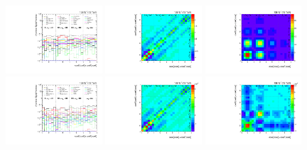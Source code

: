 \begin{figure}[htb]
\begin{center}
 \includegraphics[width=0.32\textwidth]{fig_fullRun2UL/unfolding/combined/deltaSystCombinedlog_rebinnedB_c_Pnk_mttbar.pdf}
 \includegraphics[width=0.32\textwidth]{fig_fullRun2UL/unfolding/combined/StatCovMatrix_rebinnedB_c_Pnk_mttbar.pdf}
 \includegraphics[width=0.32\textwidth]{fig_fullRun2UL/unfolding/combined/TotalSystCovMatrix_rebinnedB_c_Pnk_mttbar.pdf} \\
 \includegraphics[width=0.32\textwidth]{fig_fullRun2UL/unfolding/combined/deltaSystCombinedlogNorm_rebinnedB_c_Pnk_mttbar.pdf}
 \includegraphics[width=0.32\textwidth]{fig_fullRun2UL/unfolding/combined/StatCovMatrixNorm_rebinnedB_c_Pnk_mttbar.pdf}
 \includegraphics[width=0.32\textwidth]{fig_fullRun2UL/unfolding/combined/TotalSystCovMatrixNorm_rebinnedB_c_Pnk_mttbar.pdf} \\

\end{center}
\end{figure}
